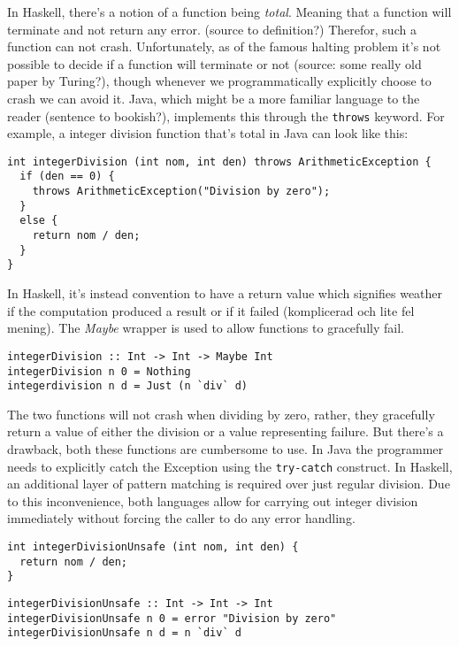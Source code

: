 In Haskell, there's a notion of a function being \emph{total}. Meaning that a
function will terminate and not return any error. (source to definition?)
Therefor, such a function can not crash. Unfortunately, as of the famous
halting problem it's not possible to decide if a function will terminate or not
(source: some really old paper by Turing?), though whenever we programmatically
explicitly choose to crash we can avoid it. Java, which might be a more
familiar language to the reader (sentence to bookish?), implements this through the
\texttt{throws} keyword. For example, a integer division function that's total in
Java can look like this:

\begin{verbatim}
int integerDivision (int nom, int den) throws ArithmeticException {
  if (den == 0) {
    throws ArithmeticException("Division by zero");
  }
  else {
    return nom / den;
  }
}
\end{verbatim}

In Haskell, it's instead convention to have a return value which signifies
weather if the computation produced a result or if it failed (komplicerad och lite fel mening).
The \emph{Maybe}
wrapper is used to allow functions to gracefully fail.



\begin{verbatim}
integerDivision :: Int -> Int -> Maybe Int
integerDivision n 0 = Nothing
integerdivision n d = Just (n `div` d)
\end{verbatim}

The two functions will not crash when dividing by zero,
rather, they gracefully return a value of either the division or a
value representing failure. But there's a drawback, both
these functions are cumbersome to use. In Java the programmer needs to
explicitly catch the Exception using the \texttt{try-catch} construct.
In Haskell, an additional layer of pattern matching is required over
just regular division. Due to this inconvenience, both languages allow
for carrying out integer division immediately without forcing the caller
to do any error handling.

\begin{verbatim}
int integerDivisionUnsafe (int nom, int den) {
  return nom / den;
}
\end{verbatim}

\begin{verbatim}
integerDivisionUnsafe :: Int -> Int -> Int
integerDivisionUnsafe n 0 = error "Division by zero"
integerDivisionUnsafe n d = n `div` d
\end{verbatim}

